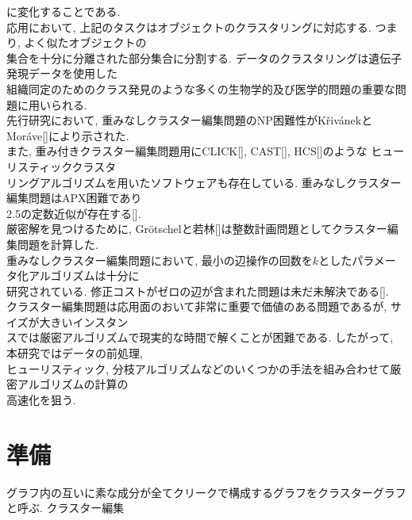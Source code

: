 \documentclass[10.5,a4paper,titlepage]{bxjsarticle}
\begin{document}
に変化することである.\\


応用において, 上記のタスクはオブジェクトのクラスタリングに対応する. つまり, よく似たオブジェクトの\\

集合を十分に分離された部分集合に分割する.
データのクラスタリングは遺伝子発現データを使用した\\

組織同定のためのクラス発見のような多くの生物学的及び医学的問題の重要な問題に用いられる.\\



先行研究において, 重みなしクラスター編集問題のNP困難性がKřivánekとMoráve[]により示された. \\

また, 重み付きクラスター編集問題用にCLICK[], CAST[], HCS[]のような
ヒューリスティッククラスタ\\

リングアルゴリズムを用いたソフトウェアも存在している. 重みなしクラスター編集問題はAPX困難であり\\

2.5の定数近似が存在する[].\\


厳密解を見つけるために, Grötschelと若林[]は整数計画問題としてクラスター編集問題を計算した. \\


重みなしクラスター編集問題において, 最小の辺操作の回数を$k$としたパラメータ化アルゴリズムは十分に\\

研究されている.
修正コストがゼロの辺が含まれた問題は未だ未解決である[].\\




クラスター編集問題は応用面のおいて非常に重要で価値のある問題であるが, サイズが大きいインスタン\\

スでは厳密アルゴリズムで現実的な時間で解くことが困難である.
したがって, 本研究ではデータの前処理, \\

ヒューリスティック, 分枝アルゴリズムなどのいくつかの手法を組み合わせて厳密アルゴリズムの計算の\\

高速化を狙う.\\


\section{準備}
グラフ内の互いに素な成分が全てクリークで構成するグラフを$\textbf{クラスターグラフ}$と呼ぶ. クラスター編集\\
\end{document}
